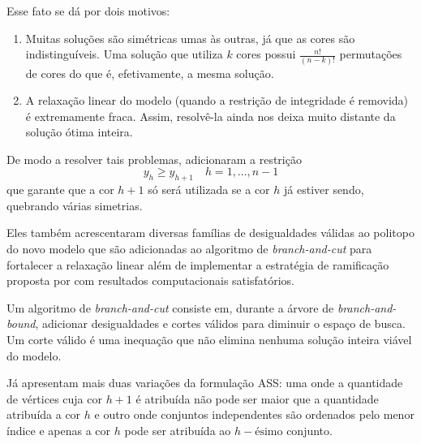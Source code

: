 \documentclass[11pt]{article}
\begin{document}
Esse fato se dá por dois motivos:
\begin{enumerate}
\item Muitas soluções são simétricas umas às outras, já que as cores são indistinguíveis. Uma solução que utiliza \(k\) cores possui \(\frac{n!}{(n-k)!}\) permutações de cores do que é, efetivamente, a mesma solução.
\item A relaxação linear do modelo (quando a restrição de integridade é removida) é extremamente fraca. Assim, resolvê-la ainda nos deixa muito distante da solução ótima inteira.
\end{enumerate}

De modo a resolver tais problemas, \textcite{MendezDiaz2006BranchCutAlgorithm} adicionaram a restrição
\[ y_h \geq y_{h+1} \quad h = 1, \dots, n-1 \]
que garante que a cor \(h+1\) só será utilizada se a cor \(h\) já estiver sendo, quebrando várias simetrias.

Eles também acrescentaram diversas famílias de desigualdades válidas ao politopo do novo modelo que são adicionadas ao algoritmo de \emph{branch-and-cut} para fortalecer a relaxação linear além de implementar a estratégia de ramificação proposta por \textcite{Brelaz1979Newmethodscolor} com resultados computacionais satisfatórios.

Um algoritmo de \emph{branch-and-cut} consiste em, durante a árvore de \emph{branch-and-bound}, adicionar desigualdades e cortes válidos para diminuir o espaço de busca.
Um corte válido é uma inequação que não elimina nenhuma solução inteira viável do modelo.

Já \textcite{MendezDiaz2008CuttingPlaneAlgorithm} apresentam mais duas variações da formulação ASS: uma onde a quantidade de vértices cuja cor \(h+1\) é atribuída não pode ser maior que a quantidade atribuída a cor \(h\) e outro onde conjuntos independentes são ordenados pelo menor índice e apenas a cor \(h\) pode ser atribuída ao \(h-\text{ésimo}\) conjunto.
\end{document}

